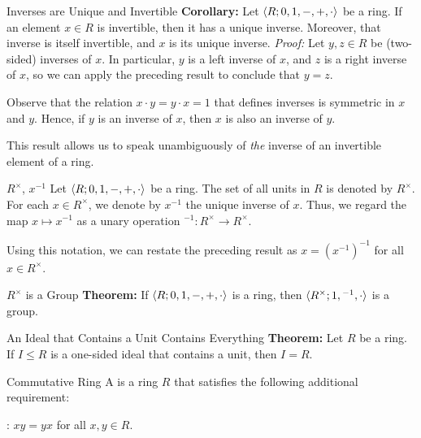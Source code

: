 \begin{thmbox}{Inverses are Unique and Invertible}
	\textbf{Corollary:} Let ${\langle {R; 0, 1, -, +, \cdot} \rangle}$ be a ring. If an element $x \in R$ is invertible, then it has a unique inverse. Moreover, that inverse is itself invertible, and $x$ is its unique inverse.
	\tcblower
	\textit{Proof:} Let $y,z \in R$ be (two-sided) inverses of $x$. In particular, $y$ is a left inverse of $x$, and $z$ is a right inverse of $x$, so we can apply the preceding result to conclude that $y = z$.

	Observe that the relation $x \cdot y = y \cdot x = 1$ that defines inverses is symmetric in $x$ and $y$. Hence, if $y$ is an inverse of $x$, then $x$ is also an inverse of $y$.
\end{thmbox}

This result allows us to speak unambiguously of \textit{the} inverse of an invertible element of a ring.

\begin{dfnbox}{$R^\times$, $x^{-1}$}
	Let ${\langle {R; 0, 1, -, +, \cdot} \rangle}$ be a ring. The set of all units in $R$ is denoted by $R^\times$. For each $x \in R^\times$, we denote by $x^{-1}$ the unique inverse of $x$. Thus, we regard the map $x \mapsto x^{-1}$ as a unary operation ${}^{-1}: R^\times \to R^\times$.
\end{dfnbox}

Using this notation, we can restate the preceding result as $x = (x^{-1})^{-1}$ for all $x \in R^\times$.

\begin{thmbox}{$R^\times$ is a Group}
	\textbf{Theorem:} If ${\langle {R; 0, 1, -, +, \cdot} \rangle}$ is a ring, then ${\langle {R^\times; 1, {}^{-1}, \cdot} \rangle}$ is a group.
\end{thmbox}

\begin{thmbox}{An Ideal that Contains a Unit Contains Everything}
	\textbf{Theorem:} Let $R$ be a ring. If $I \le R$ is a one-sided ideal that contains a unit, then $I = R$.
\end{thmbox}

\begin{dfnbox}{Commutative Ring}
	A  is a ring $R$ that satisfies the following additional requirement:
	\begin{dfnitems}
		\item {}: $xy = yx$ for all $x, y \in R$.
	\end{dfnitems}
\end{dfnbox}

